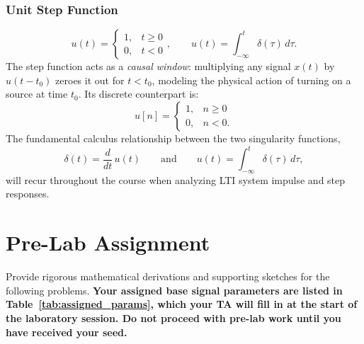 \documentclass[11pt,letterpaper]{article}
\begin{document}
\subsubsection{Unit Step Function}
\begin{equation}
    u(t) = \begin{cases} 1, & t \geq 0 \\ 0, & t < 0 \end{cases}, \qquad u(t) = \int_{-\infty}^{t} \delta(\tau)\, d\tau.
    \label{eq:step}
\end{equation}
The step function acts as a \emph{causal window}: multiplying any signal $x(t)$ by $u(t - t_0)$ zeroes it out for $t < t_0$, modeling the physical action of turning on a source at time $t_0$. Its discrete counterpart is:
\begin{equation}
    u[n] = \begin{cases} 1, & n \geq 0 \\ 0, & n < 0. \end{cases}
\end{equation}
The fundamental calculus relationship between the two singularity functions,
\begin{equation}
    \delta(t) = \frac{d}{dt}\,u(t) \qquad \text{and} \qquad u(t) = \int_{-\infty}^{t} \delta(\tau)\, d\tau,
    \label{eq:delta_step_relation}
\end{equation}
will recur throughout the course when analyzing LTI system impulse and step responses.

\clearpage

\section{Pre-Lab Assignment}

Provide rigorous mathematical derivations and supporting sketches for the following problems. \textbf{Your assigned base signal parameters are listed in Table~\ref{tab:assigned_params}, which your TA will fill in at the start of the laboratory session. Do not proceed with pre-lab work until you have received your seed.}
\end{document}
